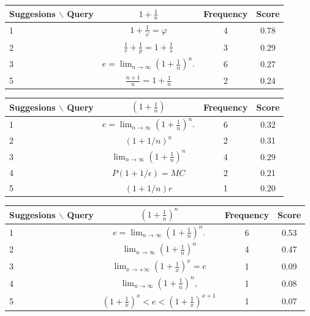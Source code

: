 \documentclass[12pt]{article} %
\begin{document}
\begin{center}
\begin{tabular}{lccc}
Suggesions $\backslash$ Query  & $ 1+\frac 1 n $ & Frequency & Score \\
\hline
 1 &  $ 1+\frac{1}{\varphi}=\varphi $ & 4 & 0.78 \\
 2 &  $ \frac{1}{r}+\frac{1}{p}=1+\frac{1}{s} $ & 3 & 0.29 \\
 3 &  $ e=\lim_{n\to\infty}\left(1+\frac{1}{n}\right)^{n}. $ & 6 & 0.27 \\
 5 &  $ \frac{n+1}{n}=1+\frac{1}{n} $ & 2 & 0.24 \\
\end{tabular}
\end{center}

\begin{center}
\begin{tabular}{lccc}
Suggesions $\backslash$ Query  & $ (1+\frac 1 n) $ & Frequency & Score \\
\hline
 1 &  $ e=\lim_{n\to\infty}\left(1+\frac{1}{n}\right)^{n}. $ & 6 & 0.32 \\
 2 &  $ (1+1/n)^{n} $ & 2 & 0.31 \\
 3 &  $  \lim_{n\to\infty}\left(1+\frac{1}{n}\right)^{n} $ & 4 & 0.29 \\
 4 &  $ P(1+1/{\epsilon})=MC $ & 2 & 0.21 \\
 5 &  $ (1+1/n)r $ & 1 & 0.20 \\
\end{tabular}
\end{center}

\begin{center}
\begin{tabular}{lccc}
Suggesions $\backslash$ Query  & $ (1+\frac 1 n)^n $ & Frequency & Score \\
\hline
 1 &  $ e=\lim_{n\to\infty}\left(1+\frac{1}{n}\right)^{n}. $ & 6 & 0.53 \\
 2 &  $  \lim_{n\to\infty}\left(1+\frac{1}{n}\right)^{n} $ & 4 & 0.47 \\
 3 &  $ \lim_{x\to+\infty}\left(1+\frac{1}{x}\right)^{x}=e $ & 1 & 0.09 \\
 4 &  $ \lim_{n\to\infty}\left(1+\frac{1}{n}\right)^{n}, $ & 1 & 0.08 \\
 5 &  $ \left(1+\frac{1}{x}\right)^{x}<e<\left(1+\frac{1}{x}\right)^{x+1} $ & 1 & 0.07 \\
\end{tabular}
\end{center}
\end{document}
